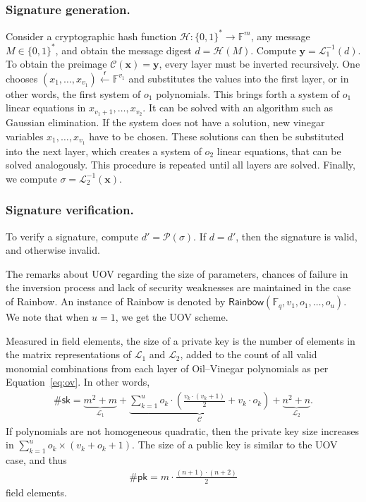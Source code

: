 \documentclass[draft, 12pt, a4paper, oneside]{memoir}
\newcommand{\random}{\overset{\mathsf{r}}{\gets}}
\theoremstyle{definition}
\begin{document}
\subsubsection{Signature generation.}

Consider a cryptographic hash function $\mathcal{H} : \{0, 1\}^{*} \to \mathbb{F}^{m}$, any message $M \in \{0, 1\}^{*}$, and obtain the message digest $d = \mathcal{H}(M)$. Compute $\mathbf{y} = \mathcal{L}_{1}^{-1}(d)$. To obtain the preimage $\mathcal{C}(\mathbf{x}) = \mathbf{y}$, every layer must be inverted recursively. One chooses $(x_{1}, \dots, x_{v_{1}}) \random \mathbb{F}^{v_{1}}$ and substitutes the values into the first layer, or in other words, the first system of $o_{1}$ polynomials. This brings forth a system of $o_{1}$ linear equations in $x_{v_{1} + 1}, \dots, x_{v_{2}}$. It can be solved with an algorithm such as Gaussian elimination. If the system does not have a solution, new vinegar variables $x_{1}, \dots, x_{v_{1}}$ have to be chosen. These solutions can then be substituted into the next layer, which creates a system of $o_{2}$ linear equations, that can be solved analogously. This procedure is repeated until all layers are solved. Finally, we compute $\sigma = \mathcal{L}_{2}^{-1}(\mathbf{x})$.

\subsubsection{Signature verification.}

To verify a signature, compute $d' = \mathcal{P}(\sigma)$. If $d = d'$, then
the signature is valid, and otherwise invalid.

The remarks about UOV regarding the size of parameters, chances of failure in the inversion process and lack of security weaknesses are maintained in the case of Rainbow. An instance of Rainbow is denoted by $\mathsf{Rainbow}(\mathbb{F}_{q}, v_{1}, o_{1}, \dots, o_{u})$. We note that when $u = 1$, we get the UOV scheme.

Measured in field elements, the size of a private key is the number of elements in the matrix representations of $\mathcal{L}_{1}$ and $\mathcal{L}_{2}$, added to the count of all valid monomial combinations from each layer of Oil--Vinegar polynomials as per Equation~\ref{eq:ov}. In other words,
\begin{align}
  \#\mathsf{sk} = \underbrace{m^{2} + m}_{\mathcal{L}_{1}} 
    + \underbrace{\sum_{k = 1}^{u} o_{k} \cdot \left( \frac{v_{k} \cdot (v_{k} + 1)}{2} + v_{k} \cdot o_{k} \right)}_{\mathcal{C}}
    + \underbrace{n^{2} + n}_{\mathcal{L}_{2}}.
\end{align}
If polynomials are not homogeneous quadratic, then the private key size increases in $\sum_{k = 1}^{u} o_{k} \times (v_{k} + o_{k} + 1)$. The size of a public key is similar to the UOV case, and thus
\begin{align}
  \#\mathsf{pk} = m \cdot \frac{(n + 1) \cdot (n + 2)}{2}
\end{align}
field elements.
\end{document}
